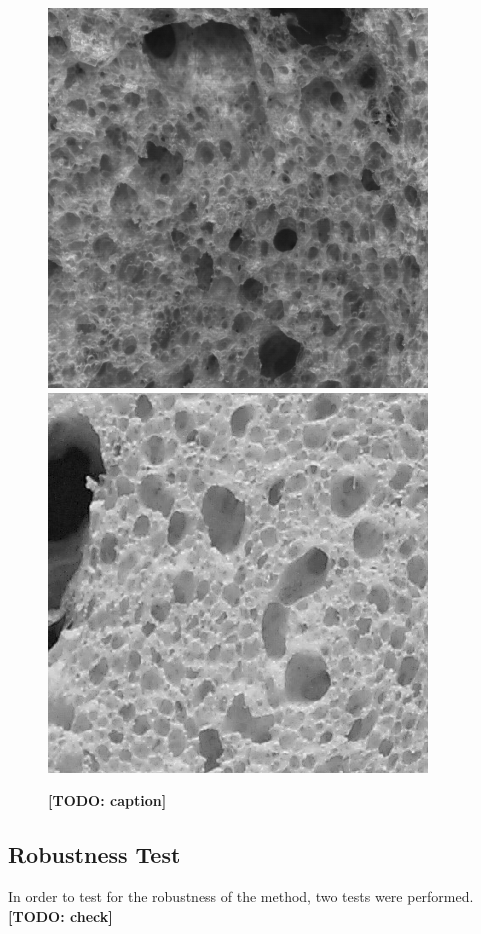 \documentclass[oneside,a4paper,english,links]{amca}
\newcommand{\todo}[1]{\textbf{[TODO: #1]}}
\begin{document}
\begin{figure}[htb]
\centering
\includegraphics[scale=0.28]{imagenes/gonzales/allied1}
\includegraphics[scale=0.28]{imagenes/gonzales/allied2c}
\caption{\todo{caption}}
\label{fig:gonzales}
\end{figure}

\subsection{Robustness Test}
In order to test for the robustness of the method, two tests were performed.\todo{check}
\end{document}
